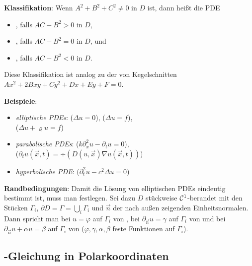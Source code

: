 \textbf{Klassifikation}:
Wenn $A^2 + B^2 + C^2 \not= 0$ in $D$ ist, dann heißt die PDE
\begin{itemize}
    \item
    , falls $AC - B^2 > 0$ in $D$,
    
    \item
    , falls $AC - B^2 = 0$ in $D$, und
    
    \item
    , falls $AC - B^2 < 0$ in $D$.
\end{itemize}
Diese Klassifikation ist analog zu der von Kegelschnitten $Ax^2 + 2Bxy + Cy^2 + Dx + Ey + F = 0$.

\textbf{Beispiele}:
\begin{itemize}
    \item
    \emph{elliptische PDEs}:
    ($\Delta u = 0$),
    ($\Delta u = f$),\\
    ($\Delta u + \varrho u = f$)
    
    \item
    \emph{parabolische PDEs}:
    ($k \partial_x^2 u - \partial_t u = 0$),\\
    ($\partial_t u(\vec{x}, t) = \div(D(u, \vec{x}) \nabla u(\vec{x}, t))$)
    
    \item
    \emph{hyperbolische PDE}:
    ($\partial_t^2 u - c^2 \Delta u = 0$)
\end{itemize}

\linie

\textbf{Randbedingungen}:
Damit die Lösung von elliptischen PDEs eindeutig bestimmt ist, muss man
 festlegen.
Sei dazu $D$ stückweise $\mathcal{C}^1$-berandet mit den Stücken $\Gamma_i$,
$\partial D = \Gamma = \bigcup_i \Gamma_i$ und $\vec{n}$ der nach außen zeigenden
Einheitsnormalen.
Dann spricht man bei $u = \varphi$ auf $\Gamma_i$ von ,
bei $\partial_{\vec{n}} u = \gamma$ auf $\Gamma_i$ von  und
bei $\partial_{\vec{n}} u + \alpha u = \beta$ auf $\Gamma_i$ von 
($\varphi, \gamma, \alpha, \beta$ feste Funktionen auf $\Gamma_i$).

\pagebreak

\subsection{%
    -Gleichung in Polarkoordinaten%
}

